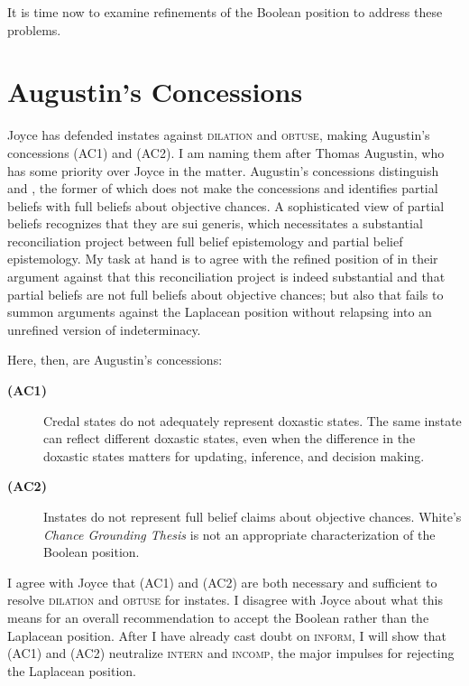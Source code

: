 \documentclass[phd,12pt,oneside]{ubcthesis}
\begin{document}
{\noindent}It is time now to examine refinements of the Boolean position to
address these problems.

\section{Augustin's Concessions}
\label{sec:oneilafa}

Joyce has defended instates against \textsc{dilation} and
\textsc{obtuse}, making Augustin's concessions (AC1) and (AC2). I am
naming them after Thomas Augustin, who has some priority over Joyce in
the matter. Augustin's concessions distinguish {\anderson} and
{\augustin}, the former of which does not make the concessions and
identifies partial beliefs with full beliefs about objective chances.
A sophisticated view of partial beliefs recognizes that they are sui
generis, which necessitates a substantial reconciliation project
between full belief epistemology and partial belief epistemology. My
task at hand is to agree with the refined position of {\augustin} in
their argument against {\anderson} that this reconciliation project is
indeed substantial and that partial beliefs are not full beliefs about
objective chances; but also that {\augustin} fails to summon arguments
against the Laplacean position without relapsing into an unrefined
version of indeterminacy.

Here, then, are Augustin's concessions:

\begin{description}
\item[{\bf (AC1)}] Credal states do not adequately represent doxastic
  states. The same instate can reflect different doxastic states, even
  when the difference in the doxastic states matters for updating,
  inference, and decision making.
\item[{\bf (AC2)}] Instates do not represent full belief claims about
  objective chances. White's \emph{Chance Grounding Thesis} is not an
  appropriate characterization of the Boolean position.
\end{description}

{\noindent}I agree with Joyce that (AC1) and (AC2) are both necessary and
sufficient to resolve \textsc{dilation} and \textsc{obtuse} for
instates. I disagree with Joyce about what this means for an overall
recommendation to accept the Boolean rather than the Laplacean
position. After I have already cast doubt on \textsc{inform}, I will
show that (AC1) and (AC2) neutralize \textsc{intern} and
\textsc{incomp}, the major impulses for rejecting the Laplacean
position. 
\end{document}
